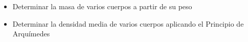 \documentclass[../main]{subfiles}
\begin{document}
\begin{itemize}
  \item Determinar la masa de varios cuerpos a partir de su peso
  \item Determinar la densidad media de varios cuerpos aplicando el Principio de Arquímedes
\end{itemize}
\end{document}
